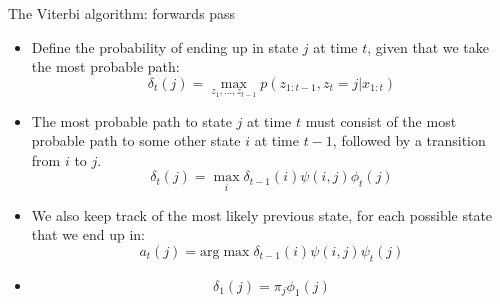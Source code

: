 \documentclass[10pt,mathserif]{beamer}
\begin{document}
\begin{frame}{The Viterbi algorithm: forwards pass}
\begin{itemize}
    \item Define the probability of ending up in state $j$ at time $t$, given that we take the most probable path:
    \begin{equation}
        \delta_t(j) =  \max_{z_1,...,z_{t -1}} p(z_{1:t-1}, z_{t} = j|x_{1:t}) 
    \end{equation}
    
    \item The most probable path to state $j$ at time $t$ must consist of the most probable path to some other state $i$ at time $t - 1$, followed by a transition from $i$ to $j$.
    \begin{equation}
        \delta_t(j) = \max_i\delta_{t-1}(i)\psi(i,j)\phi_t(j)
    \end{equation}

    \item We also keep track of the most likely previous state, for each possible state that we end up in:
    \begin{equation}
        a_t(j) = \text{arg}\max\delta_{t-1}(i)\psi(i,j)\psi_t(j)
    \end{equation}
    
    \item
    \begin{equation}
        \delta_1(j) = \pi_j\phi_1(j)
    \end{equation}
\end{itemize}
\end{frame}
\end{document}
